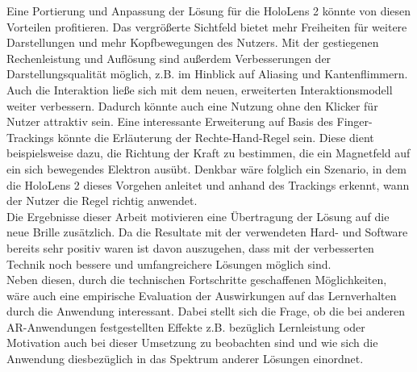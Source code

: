 Eine Portierung und Anpassung der Lösung für die HoloLens 2 könnte von diesen Vorteilen profitieren. Das vergrößerte Sichtfeld bietet mehr Freiheiten für weitere Darstellungen und mehr Kopfbewegungen des Nutzers. Mit der gestiegenen Rechenleistung und Auflösung sind außerdem Verbesserungen der Darstellungsqualität möglich, z.B. im Hinblick auf Aliasing und Kantenflimmern. Auch die Interaktion ließe sich mit dem neuen, erweiterten Interaktionsmodell weiter verbessern. Dadurch könnte auch eine Nutzung ohne den Klicker für Nutzer attraktiv sein.
\noindent\hspace*{5mm}
Eine interessante Erweiterung auf Basis des Finger-Trackings könnte die Erläuterung der Rechte-Hand-Regel sein. Diese dient beispielsweise dazu, die Richtung der Kraft zu bestimmen, die ein Magnetfeld auf ein sich bewegendes Elektron ausübt. Denkbar wäre folglich ein Szenario, in dem die HoloLens 2 dieses Vorgehen anleitet und anhand des Trackings erkennt, wann der Nutzer die Regel richtig anwendet.\\

Die Ergebnisse dieser Arbeit motivieren eine Übertragung der Lösung auf die neue Brille zusätzlich. Da die Resultate mit der verwendeten Hard- und Software bereits sehr positiv waren ist davon auszugehen, dass mit der verbesserten Technik noch bessere und umfangreichere Lösungen möglich sind.\\

Neben diesen, durch die technischen Fortschritte geschaffenen Möglichkeiten, wäre auch eine empirische Evaluation der Auswirkungen auf das Lernverhalten durch die Anwendung interessant. Dabei stellt sich die Frage, ob die bei anderen AR-Anwendungen festgestellten Effekte z.B. bezüglich Lernleistung oder Motivation auch bei dieser Umsetzung zu beobachten sind und wie sich die Anwendung diesbezüglich in das Spektrum anderer Lösungen einordnet. 

